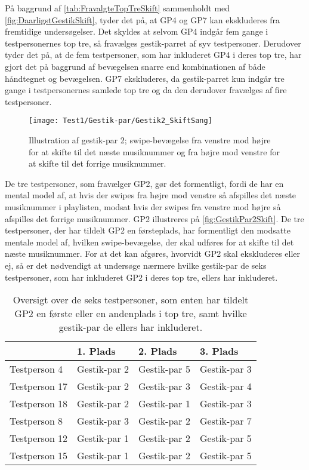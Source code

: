 \noindent
%
På baggrund af \autoref{tab:FravalgteTopTreSkift} sammenholdt med \autoref{fig:DaarligstGestikSkift}, tyder det på, at GP4 og GP7 kan ekskluderes fra fremtidige undersøgelser. Det skyldes at selvom GP4 indgår fem gange i testpersonernes top tre, så fravælges gestik-parret af syv testpersoner. Derudover tyder det på, at de fem testpersoner, som har inkluderet GP4 i deres top tre, har gjort det på baggrund af bevægelsen snarre end kombinationen af både håndtegnet og bevægelsen. GP7 ekskluderes, da gestik-parret kun indgår tre gange i testpersonernes samlede top tre og da den derudover fravælges af fire testpersoner. 
%
\begin{figure}[H]
	\centering
	\texttt{[image: Test1/Gestik-par/Gestik2\_SkiftSang]}
	\caption{Illustration af gestik-par 2; swipe-bevægelse fra venstre mod højre for at skifte til det næste musiknummer og fra højre mod venstre for at skifte til det forrige musiknummer.}
	\label{fig:GestikPar2Skift}
\end{figure}
\noindent
%
De tre testpersoner, som fravælger GP2, gør det formentligt, fordi de har en mental model af, at hvis der swipes fra højre mod venstre så afspilles det næste musiknummer i playlisten, modsat hvis der swipes fra venstre mod højre så afspilles det forrige musiknummer. GP2 illustreres på \autoref{fig:GestikPar2Skift}. De tre testpersoner, der har tildelt GP2 en førsteplads, har formentligt den modsatte mentale model af, hvilken swipe-bevægelse, der skal udføres for at skifte til det næste musiknummer. For at det kan afgøres, hvorvidt GP2 skal ekskluderes eller ej, så er det nødvendigt at undersøge nærmere hvilke gestik-par de seks testpersoner, som har inkluderet GP2 i deres top tre, ellers har inkluderet. 
%
\begin{table}[H]
	\centering
	\begin{tabular}{ | p{3cm} | p{3cm} | p{3cm} | p{3cm} |}
	\hline
		 & 1. Plads & 2. Plads & 3. Plads \\ \hline
		Testperson 4 & Gestik-par 2 & Gestik-par 5 & Gestik-par 3 \\ \hline
		Testperson 17 & Gestik-par 2 & Gestik-par 3 & Gestik-par 4 \\ \hline
		Testperson 18 & Gestik-par 2 & Gestik-par 1 & Gestik-par 3 \\ \hline
		Testperson 8 & Gestik-par 3 & Gestik-par 2 & Gestik-par 7 \\ \hline
		Testperson 12 & Gestik-par 1 & Gestik-par 2 & Gestik-par 5\\ \hline
		Testperson 15 & Gestik-par 1 & Gestik-par 2 & Gestik-par 5 \\ \hline
	\end{tabular}
	\caption{Oversigt over de seks testpersoner, som enten har tildelt GP2 en første eller en andenplads i top tre, samt hvilke gestik-par de ellers har inkluderet.}
	\label{tab:GestikPar2ITopTre}
\end{table}
